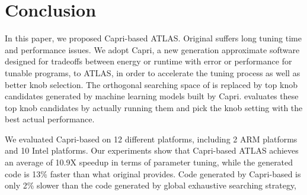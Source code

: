 \section{Conclusion}
\label{sec:conclusion}

In this paper, we proposed Capri-based ATLAS. Original \atl suffers long
tuning time and performance issues. We adopt Capri, a new generation
approximate software designed for tradeoffs between
energy or runtime with error or performance for tunable programs, to ATLAS,
in order to accelerate the tuning process as well as better knob selection.
The orthogonal searching space of \atl is replaced by top knob candidates
generated by machine learning models built by Capri. \atl evaluates these
top knob candidates by actually running them and pick the knob setting with the
best actual performance.

We evaluated Capri-based \atl on 12 different platforms, including 2 ARM
platforms and 10 Intel platforms. Our experiments show
that Capri-based ATLAS achieves an average of 10.9X speedup in terms of
parameter tuning, while the generated code is 13\% faster than what original
\atl provides. Code generated by Capri-based \atl is only 2\% slower than the
code generated by global exhaustive searching strategy,
